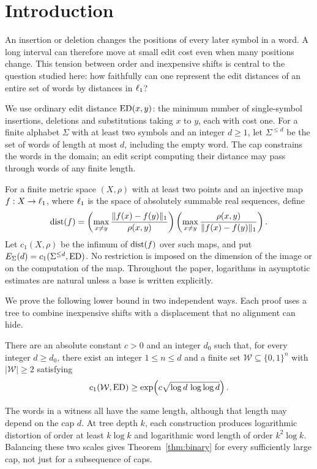 \section{Introduction}\label{sec:introduction}

An insertion or deletion changes the positions of every later symbol in
a word. A long interval can therefore move at small edit cost even when
many positions change. This tension between order and inexpensive shifts
is central to the question studied here: how faithfully can one represent
the edit distances of an entire set of words by distances in $\ell_1$?

We use ordinary edit distance $\operatorname{ED}(x,y)$: the minimum number of
single-symbol insertions, deletions and substitutions taking $x$ to $y$,
each with cost one. For a finite alphabet $\Sigma$ with at least two
symbols and an integer
$d\geq1$, let $\Sigma^{\leq d}$ be the set of words of length at most
$d$, including the empty word. The cap constrains the words in the
domain; an edit script computing their distance may pass through words
of any finite length.

For a finite metric space $(X,\rho)$ with at least two points and an
injective map $f:X\to\ell_1$, where $\ell_1$ is the space of absolutely
summable real sequences, define
\[
 \operatorname{dist}(f)=
 \left(\max_{x\ne y}\frac{\|f(x)-f(y)\|_1}{\rho(x,y)}\right)
 \left(\max_{x\ne y}\frac{\rho(x,y)}{\|f(x)-f(y)\|_1}\right).
\]
Let $c_1(X,\rho)$ be the infimum of $\operatorname{dist}(f)$ over such maps, and put
$E_\Sigma(d)=c_1(\Sigma^{\leq d},\operatorname{ED})$. No restriction is imposed on
the dimension of the image or on the computation of the map. Throughout
the paper, logarithms in asymptotic estimates are natural unless a base
is written explicitly.

We prove the following lower bound in two independent ways. Each proof
uses a tree to combine inexpensive shifts with a displacement that no
alignment can hide.

\begin{theorem}\label{thm:binary}
There are an absolute constant $c>0$ and an integer $d_0$ such that,
for every integer $d\geq d_0$, there exist an integer $1\leq n\leq d$ and a
finite set $\mathcal W\subseteq\{0,1\}^n$ with $|\mathcal W|\geq2$
satisfying
\[
 c_1(\mathcal W,\operatorname{ED})
 \geq \exp\!\left(c\sqrt{\log d\,\log\log d}\right).
\]
\end{theorem}

The words in a witness all have the same length, although that length
may depend on the cap $d$. At tree depth $k$, each construction
produces logarithmic distortion of order at least $k\log k$ and
logarithmic word length of order $k^2\log k$. Balancing these two scales
gives Theorem~\ref{thm:binary} for every sufficiently large cap, not just
for a subsequence of caps.

